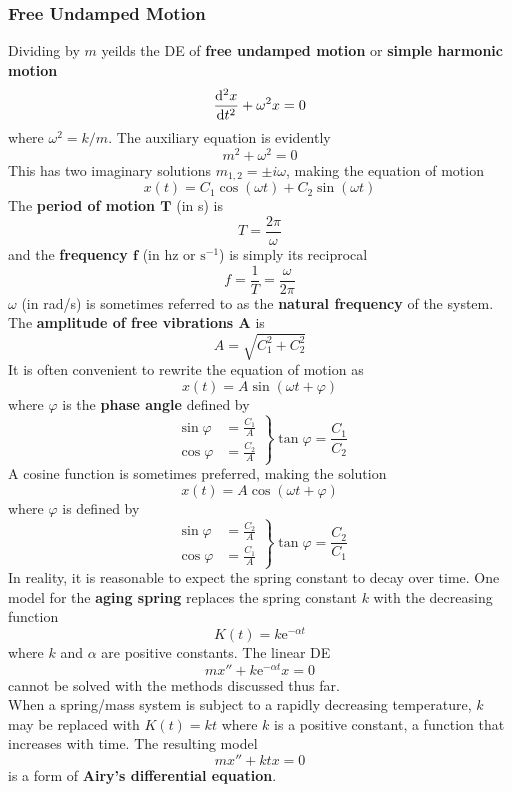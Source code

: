 \documentclass[12pt, A4]{article}
\newcommand{\en}{\text{e}}
\begin{document}
			\subsubsection{Free Undamped Motion}
				Dividing by \(m\) yeilds the DE of \textbf{free undamped motion} or \textbf{simple harmonic motion}
					\[\dv[2]{x}{t} + \omega^2x = 0\]
					where \(\omega^2 = k/m\). The auxiliary equation is evidently
					\[m^2 + \omega^2 = 0\]
					This has two imaginary solutions \(m_{1,2} = \pm i\omega\), making the equation of motion
					\[x(t) = C_1\cos(\omega t) + C_2\sin(\omega t)\]
					The \textbf{period of motion \(\bm{T}\)} (in s) is
					\[T = \frac{2\pi}{\omega}\]
					and the \textbf{frequency \(\bm{f}\)} (in hz or \(\mathrm{s^{-1}}\)) is simply its reciprocal
					\[
						f = \frac{1}{T}
							= \frac{\omega}{2\pi}
					\]
				\(\omega\) (in rad/s) is sometimes referred to as the \textbf{natural frequency} of the system. \\
				The \textbf{amplitude of free vibrations \(\bm{A}\)} is
					\[A = \sqrt{C_1^2 + C_2^2}\]
					It is often convenient to rewrite the equation of motion as
					\[x(t) = A\sin(\omega t + \varphi)\]
					where \(\varphi\) is the \textbf{phase angle} defined by
					\[
						\left.\begin{aligned}
							\sin\varphi &= \frac{C_1}{A} \\
							\cos\varphi &= \frac{C_2}{A}
						\end{aligned}\right\}
						\tan\varphi = \frac{C_1}{C_2}
					\]
					A cosine function is sometimes preferred, making the solution
					\[x(t) = A\cos(\omega t + \varphi)\]
					where \(\varphi\) is defined by
					\[
						\left.\begin{aligned}
							\sin\varphi &= \frac{C_2}{A} \\
							\cos\varphi &= \frac{C_1}{A}
						\end{aligned}\right\}
						\tan\varphi = \frac{C_2}{C_1}
					\]
					In reality, it is reasonable to expect the spring constant to decay over time. One model for the \textbf{aging spring} replaces the spring constant \(k\) with the decreasing function
					\[K(t) = k\en^{-\alpha t}\]
					where \(k\) and \(\alpha\) are positive constants. The linear DE
					\[mx'' + k\en^{-\alpha t}x = 0\]
					cannot be solved with the methods discussed thus far. \\
					When a spring/mass system is subject to a rapidly decreasing temperature, \(k\) may be replaced with \(K(t) = kt\) where \(k\) is a positive constant, a function that increases with time. The resulting model
					\[mx'' + ktx = 0\]
					is a form of \textbf{Airy's differential equation}.
\end{document}
